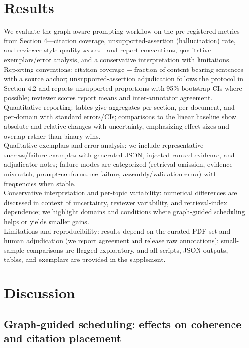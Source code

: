 \documentclass{article}%
\begin{document}
%
\section{Results}%


%
We evaluate the graph-aware prompting workflow on the pre-registered metrics from Section 4---citation coverage, unsupported-assertion (hallucination) rate, and reviewer-style quality scores---and report conventions, qualitative exemplars/error analysis, and a conservative interpretation with limitations.\\
Reporting conventions: citation coverage = fraction of content-bearing sentences with a source anchor; unsupported-assertion adjudication follows the protocol in Section 4.2 and reports unsupported proportions with 95\% bootstrap CIs where possible; reviewer scores report means and inter-annotator agreement.\\
Quantitative reporting: tables give aggregates per-section, per-document, and per-domain with standard errors/CIs; comparisons to the linear baseline show absolute and relative changes with uncertainty, emphasizing effect sizes and overlap rather than binary wins.\\
Qualitative exemplars and error analysis: we include representative success/failure examples with generated JSON, injected ranked evidence, and adjudicator notes; failure modes are categorized (retrieval omission, evidence-mismatch, prompt-conformance failure, assembly/validation error) with frequencies when stable.\\
Conservative interpretation and per-topic variability: numerical differences are discussed in context of uncertainty, reviewer variability, and retrieval-index dependence; we highlight domains and conditions where graph-guided scheduling helps or yields smaller gains.\\
Limitations and reproducibility: results depend on the curated PDF set and human adjudication (we report agreement and release raw annotations); small-sample comparisons are flagged exploratory, and all scripts, JSON outputs, tables, and exemplars are provided in the supplement.%

%
\section{Discussion}%
\subsection{Graph{-}guided scheduling: effects on coherence and citation placement}%
\end{document}
